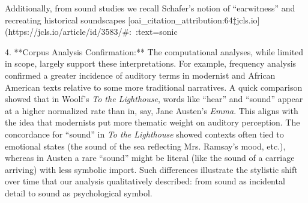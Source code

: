 \documentclass[12pt]{report}
\begin{document}
   Additionally, from sound studies we recall Schafer’s notion of “earwitness” and recreating historical soundscapes [oai_citation_attribution:64‡jcls.io](https://jcls.io/article/id/3583/#:~:text=sonic%

4. **Corpus Analysis Confirmation:** The computational analyses, while limited in scope, largely support these interpretations. For example, frequency analysis confirmed a greater incidence of auditory terms in modernist and African American texts relative to some more traditional narratives. A quick comparison showed that in Woolf’s \textit{To the Lighthouse}, words like “hear” and “sound” appear at a higher normalized rate than in, say, Jane Austen’s \textit{Emma}. This aligns with the idea that modernists put more thematic weight on auditory perception. The concordance for “sound” in \textit{To the Lighthouse} showed contexts often tied to emotional states (the sound of the sea reflecting Mrs. Ramsay’s mood, etc.), whereas in Austen a rare “sound” might be literal (like the sound of a carriage arriving) with less symbolic import. Such differences illustrate the stylistic shift over time that our analysis qualitatively described: from sound as incidental detail to sound as psychological symbol.
\end{document}
